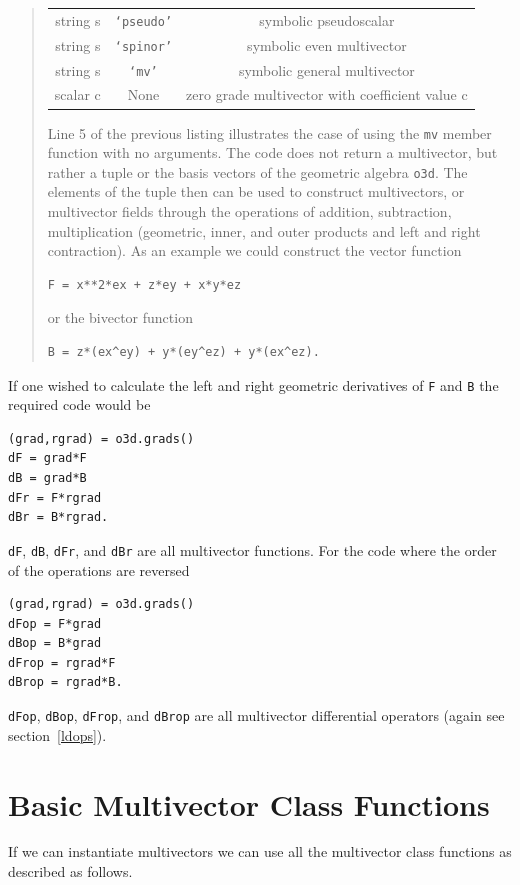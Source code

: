 \documentclass[12pt,twoside,openright]{memoir}
\newcommand{\T}[1]{\texttt{#1}}
\begin{document}
\begin{quote}
\begin{center}
\begin{tabular}{ccc}
         string s &  \T{`pseudo'} & symbolic pseudoscalar \\
         string s &  \T{`spinor'} & symbolic even multivector \\ 
         string s &  \T{`mv'} & symbolic general multivector \\
         scalar c & None  &  zero grade multivector with coefficient value c 
	\end{tabular}
\end{center}
Line 5 of the previous listing illustrates the case of using the \T{mv} member function with
no arguments. The code does not return a multivector, but rather a tuple or the basis vectors of the geometric algebra \T{o3d}.  
The elements of the tuple then can
be used to construct multivectors, or multivector fields through the operations
of addition, subtraction, multiplication (geometric, inner, and outer products and left and right contraction).
As an example we could construct the vector function
\begin{lstlisting}[numbers=none]
F = x**2*ex + z*ey + x*y*ez
\end{lstlisting}	
or the bivector function
\begin{lstlisting}[numbers=none]
B = z*(ex^ey) + y*(ey^ez) + y*(ex^ez).
\end{lstlisting}	
\end{quote}
If one wished to calculate the left and right geometric derivatives of \T{F} and \T{B} the required code would be
\begin{lstlisting}
(grad,rgrad) = o3d.grads()
dF = grad*F
dB = grad*B
dFr = F*rgrad
dBr = B*rgrad.
\end{lstlisting}
\T{dF}, \T{dB}, \T{dFr}, and \T{dBr} are all multivector functions. For the code where the order of the operations are
reversed
\begin{lstlisting}
(grad,rgrad) = o3d.grads()
dFop = F*grad
dBop = B*grad
dFrop = rgrad*F
dBrop = rgrad*B.
\end{lstlisting}
\T{dFop}, \T{dBop}, \T{dFrop}, and \T{dBrop} are all multivector differential operators (again see section~\ref{ldops}).

\section{Basic Multivector Class Functions}

If we can instantiate multivectors we can use all the multivector class functions as described as follows.
\end{document}
